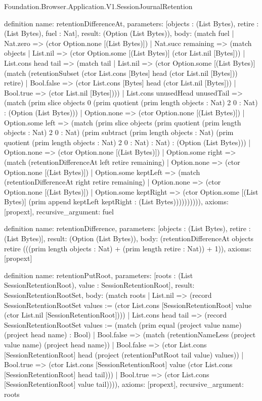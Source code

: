 \begin{lexlean}{Foundation.Browser.Application.V1.SessionJournalRetention}
\begin{semanticmodule}
definition{
  name: retentionDifferenceAt,
  parameters: [objects : (List Bytes), retire : (List Bytes), fuel : Nat],
  result: (Option (List Bytes)),
  body: (match fuel
    | Nat.zero => (ctor Option.none [(List Bytes)])
    | Nat.succ remaining => (match objects
      | List.nil => (ctor Option.some [(List Bytes)] (ctor List.nil [Bytes]))
      | List.cons head tail => (match tail
        | List.nil => (ctor Option.some [(List Bytes)] (match (retentionSubset (ctor List.cons [Bytes] head (ctor List.nil [Bytes])) retire)
          | Bool.false => (ctor List.cons [Bytes] head (ctor List.nil [Bytes]))
          | Bool.true => (ctor List.nil [Bytes])))
        | List.cons unusedHead unusedTail => (match (prim slice objects 0 (prim quotient (prim length objects : Nat) 2 0 : Nat) : (Option (List Bytes)))
          | Option.none => (ctor Option.none [(List Bytes)])
          | Option.some left => (match (prim slice objects (prim quotient (prim length objects : Nat) 2 0 : Nat) (prim subtract (prim length objects : Nat) (prim quotient (prim length objects : Nat) 2 0 : Nat) : Nat) : (Option (List Bytes)))
            | Option.none => (ctor Option.none [(List Bytes)])
            | Option.some right => (match (retentionDifferenceAt left retire remaining)
              | Option.none => (ctor Option.none [(List Bytes)])
              | Option.some keptLeft => (match (retentionDifferenceAt right retire remaining)
                | Option.none => (ctor Option.none [(List Bytes)])
                | Option.some keptRight => (ctor Option.some [(List Bytes)] (prim append keptLeft keptRight : (List Bytes)))))))))),
  axioms: [propext],
  recursive_argument: fuel
}

definition{
  name: retentionDifference,
  parameters: [objects : (List Bytes), retire : (List Bytes)],
  result: (Option (List Bytes)),
  body: (retentionDifferenceAt objects retire (((prim length objects : Nat) + (prim length retire : Nat)) + 1)),
  axioms: [propext]
}

definition{
  name: retentionPutRoot,
  parameters: [roots : (List SessionRetentionRoot), value : SessionRetentionRoot],
  result: SessionRetentionRootSet,
  body: (match roots
    | List.nil => (record SessionRetentionRootSet {values := (ctor List.cons [SessionRetentionRoot] value (ctor List.nil [SessionRetentionRoot]))})
    | List.cons head tail => (record SessionRetentionRootSet {values := (match (prim equal (project value name) (project head name) : Bool)
      | Bool.false => (match (retentionNameLess (project value name) (project head name))
        | Bool.false => (ctor List.cons [SessionRetentionRoot] head (project (retentionPutRoot tail value) values))
        | Bool.true => (ctor List.cons [SessionRetentionRoot] value (ctor List.cons [SessionRetentionRoot] head tail)))
      | Bool.true => (ctor List.cons [SessionRetentionRoot] value tail))})),
  axioms: [propext],
  recursive_argument: roots
}


\end{semanticmodule}
\end{lexlean}
